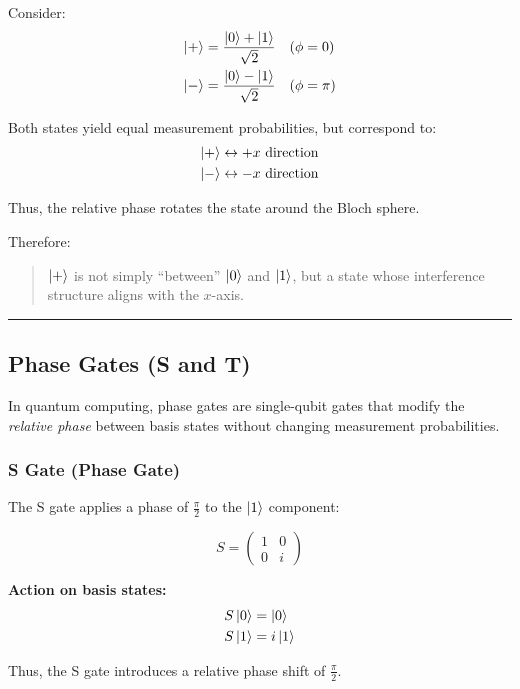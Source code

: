 Consider:
\begin{align}
\ket{+} &= \frac{\ket{0} + \ket{1}}{\sqrt{2}} \quad (\phi = 0) \\
\ket{-} &= \frac{\ket{0} - \ket{1}}{\sqrt{2}} \quad (\phi = \pi)
\end{align}

Both states yield equal measurement probabilities, but correspond to:
\begin{align}
\ket{+} &\leftrightarrow +x \text{ direction} \\
\ket{-} &\leftrightarrow -x \text{ direction}
\end{align}

Thus, the relative phase rotates the state around the Bloch sphere.

Therefore:
\begin{quote}
$\ket{+}$ is not simply ``between'' $\ket{0}$ and $\ket{1}$, but a state whose interference structure aligns with the $x$-axis.
\end{quote}

\noindent\rule{\textwidth}{1pt}

\subsection{Phase Gates (S and T)}

In quantum computing, phase gates are single-qubit gates that modify the \textit{relative phase} between basis states without changing measurement probabilities.

\subsubsection{S Gate (Phase Gate)}

The S gate applies a phase of $\frac{\pi}{2}$ to the $\ket{1}$ component:

\begin{equation}
S =
\begin{pmatrix}
1 & 0 \\
0 & i
\end{pmatrix}
\end{equation}

\textbf{Action on basis states:}
\begin{align}
S\ket{0} &= \ket{0} \\
S\ket{1} &= i\ket{1}
\end{align}

Thus, the S gate introduces a relative phase shift of $\frac{\pi}{2}$.


